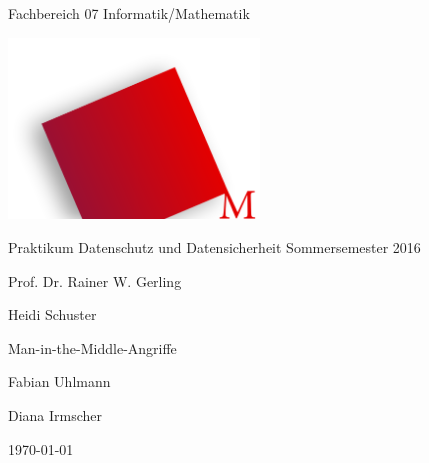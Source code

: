 	\begin{titlepage}
		\centering
		{\sffamily\huge Fachbereich 07 Informatik/Mathematik \par}
		\includegraphics[width=0.5\textwidth]{images/Hochschule_Muenchen_Logo.png}\par
		\vspace{1cm}
		{\sffamily\LARGE Praktikum Datenschutz und Datensicherheit Sommersemester 2016\par}
		\vspace{1cm}
		{\sffamily\Large Prof. Dr. Rainer W. Gerling\par}
		{\sffamily\Large Heidi Schuster\par}
		\vspace{2cm}
		{\LARGE Man-in-the-Middle-Angriffe\par}
		\vspace{1.5cm}
		{\LARGE Fabian Uhlmann\par}
		\vspace{0.5cm}
		{\LARGE Diana Irmscher\par}
		\vspace{1cm}
		{\large \today\par}
		\vfill
	\end{titlepage}